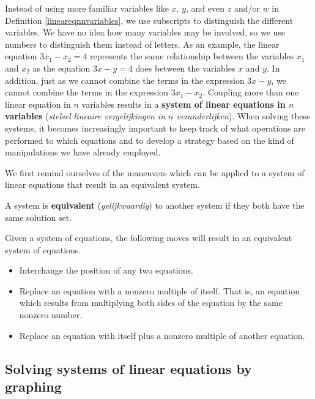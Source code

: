 Instead of using more familiar variables like $x$, $y$, and even $z$ and/or $w$ in Definition \ref{lineareqnnvariables}, we use subscripts to distinguish the different variables.  We have no idea how many variables may be involved, so we use numbers to distinguish them instead of letters. As an example, the linear equation $3x_1 - x_2 = 4$ represents the same relationship between the variables $x_1$ and $x_2$  as the equation $3x-y=4$ does between the variables $x$ and $y$. In addition, just as we cannot combine the terms in the expression $3x-y$, we cannot combine the terms in the expression $3x_1 - x_2$.  Coupling more than one linear equation in $n$ variables results in a \textbf{system of linear equations in $n$ variables} (\textit{stelsel lineaire vergelijkingen in $n$ veranderlijken}).  When solving these systems, it becomes increasingly important to keep track of what operations are performed to which equations and to develop a strategy based on the kind of manipulations we have already employed.  


We first remind ourselves of the maneuvers which can be applied to a system of linear equations that result in an equivalent system.

\begin{definition}
	A system is \textbf{equivalent} (\textit{gelijkwaardig}) to another system if they both have the same solution set.
\end{definition}

\smallskip


Given a system of equations, the following moves will result in an equivalent system of equations.
\begin{itemize}
	\item  Interchange the position of any two equations.
	\item  Replace an equation with a nonzero multiple of itself. That is, an equation which results from multiplying both sides of the equation by the same nonzero number.
	\item  Replace an equation with itself plus a nonzero multiple of another equation.
\end{itemize}
	




\subsection{Solving systems of linear equations by graphing}
\label{graphing_syst_lin_eq}

